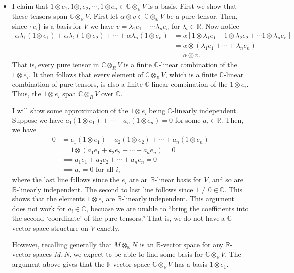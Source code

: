 \documentclass[12pt,letterpaper,boxed]{hmcpset}
\newcommand{\R}{\mathbb R}
\newcommand{\C}{\mathbb C}
\begin{document}
\begin{solution}
\begin{itemize}
\item I claim that $1 \otimes e_1, 1 \otimes, e_2, \cdots, 1 \otimes
e_n \in \C \otimes_\R V$ is a basis. First we show that these tensors
span $\C \otimes_\R V$. First let $\alpha \otimes v \in \C \otimes_\R
V$ be a pure tensor. Then, since $\{e_i\}$ is a basis for $V$ we have
$v = \lambda_1 e_1 + \cdots \lambda_n e_n$ for $\lambda_i \in \R$.
Now notice 
\begin{align*}
	\alpha\lambda_1(1 \otimes e_1) + \alpha\lambda_2(1 \otimes e_2)
		+ \cdots + \alpha\lambda_n(1 \otimes e_n) 
	&= \alpha 
	\left[ 1 \otimes \lambda_1 e_1 + 1 \otimes \lambda_2 e_2 + \cdots 1 \otimes \lambda_n e_n \right] \\
	&=  \alpha \otimes (\lambda_1 e_1 + \cdots + \lambda_n e_n) \\
	&=  \alpha \otimes v.
\end{align*}
That is, every pure tensor in $\C \otimes_R V$ is a finite $\C$-linear
combination of the $1 \otimes e_i$. It then follows that every element
of $\C \otimes_\R V$, which is a finite $\C$-linear combination of
pure tensors, is also a finite $\C$-linear combination of the $1
\otimes e_i$. Thus, the $1 \otimes e_i$ span $\C \otimes_R V$ over
$\C$. 

I will show some approximation of the $1 \otimes e_i$ being
$\C$-linearly independent. Suppose we have $a_1(1 \otimes e_1) +
\cdots + a_n(1 \otimes e_n) = 0$ for some $a_i \in \R$. Then, we have
\begin{align*}
	0 &= a_1(1 \otimes e_1) + a_2(1 \otimes e_2) + \cdots + a_n(1 \otimes e_n) \\
	&= 1 \otimes (a_1 e_1 + a_2 e_2 + \cdots + a_n e_n) = 0 \\
	&\implies a_1 e_1 + a_2 e_2 + \cdots + a_n e_n = 0 \\
	&\implies a_i = 0 \text{ for all $i$,}
\end{align*}
where the last line follows since the $e_i$ are an $\R$-linear basis
for $V$, and so are $\R$-linearly independent. The second to last line
follows since $1 \neq 0 \in \C$. 
This shows that the elements $1 \otimes e_i$ are $\R$-linearly
independent. This argument does not work for $a_i \in \C$, becuase we
are unable to ``bring the coefficients into the second `coordinate'
of the pure tensors.'' That is, we do not have a $\C$-vector space
structure on $V$ exactly.

However, recalling generally that $M \otimes_\R N$ is an $\R$-vector
space for any $\R$-vector spaces $M,N$, we expect to be able to find
some basis for $\C \otimes_\R V$.
The argument above gives that the $\R$-vector space $\C
\otimes_\R V$ has a basis $1 \otimes e_1$. 


\end{itemize}
\end{solution}
\end{document}
